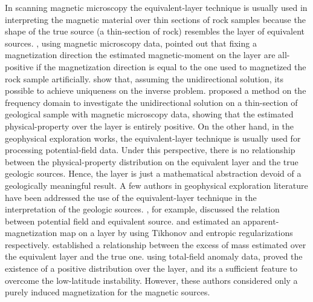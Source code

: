 In scanning magnetic microscopy the equivalent-layer technique is usually used in interpreting the magnetic material over thin sections of rock samples because the shape of the true source (a thin-section of rock) resembles the layer of equivalent sources. \cite{weiss2007}, using magnetic microscopy data, pointed out that fixing a magnetization direction the estimated magnetic-moment on the layer are all-positive if the magnetization direction is equal to the one used to magnetized the rock sample artificially. \cite{baratchart2013} show that, assuming the unidirectional solution, its possible to achieve uniqueness on the inverse problem. \cite{lima2013} proposed a method on the frequency domain to investigate the unidirectional solution on a thin-section of geological sample with magnetic microscopy data, showing that the estimated physical-property over the layer is entirely positive. On the other hand, in the geophysical exploration works, the equivalent-layer technique is usually used for processing potential-field data. Under this perspective, there is no relationship between the physical-property distribution on the equivalent layer and the true geologic sources. Hence, the layer is just a mathematical abstraction devoid of a geologically meaningful result. A few authors in geophysical exploration literature have been addressed the use of the equivalent-layer technique in the interpretation of the geologic sources. \cite{pedersen1991}, for example, discussed the relation between potential field and equivalent source. \cite{medeiros_silva1996} and \cite{silvadias_etal_2010} estimated an apparent-magnetization map on a layer by using Tikhonov and entropic regularizations respectively. \cite{siqueira_etal_2017} established a relationship between the excess of mass estimated over the equivalent layer and the true one. \cite{li_nabighian_oldenburg_2014} using total-field anomaly data, proved the existence of a positive distribution over the layer, and its a sufficient feature to overcome the low-latitude instability. However, these authors considered only a purely induced magnetization for the magnetic sources.

